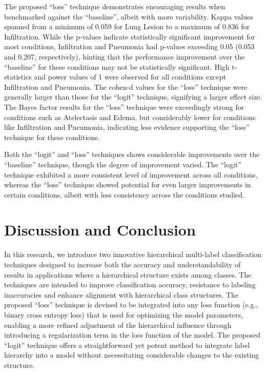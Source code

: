 \documentclass[review,1p,times,numbers]{elsarticle}
\begin{document}
The proposed ``loss'' technique demonstrates encouraging results when benchmarked against the ``baseline'', albeit with more variability. Kappa values spanned from a minimum of 0.059 for Lung Lesion to a maximum of 0.836 for Infiltration. While the p-values indicate statistically significant improvement for most conditions, Infiltration and Pneumonia had p-values exceeding 0.05 (0.053 and 0.207, respectively), hinting that the performance improvement over the ``baseline'' for these conditions may not be statistically significant. High t-statistics and power values of 1 were observed for all conditions except Infiltration and Pneumonia. The cohen-d values for the ``loss'' technique were generally larger than those for the ``logit'' technique, signifying a larger effect size. The Bayes factor results for the ``loss'' technique were exceedingly strong for conditions such as Atelectasis and Edema, but considerably lower for conditions like Infiltration and Pneumonia, indicating less evidence supporting the ``loss'' technique for these conditions.

Both the ``logit'' and ``loss'' techniques shows considerable improvements over the ``baseline'' technique, though the degree of improvement varied. The ``logit'' technique exhibited a more consistent level of improvement across all conditions, whereas the ``loss'' technique showed potential for even larger improvements in certain conditions, albeit with less consistency across the conditions studied.

\section{Discussion and Conclusion}\label{sec:taxonomy.discussion}
In this research, we introduce two innovative hierarchical multi-label classification techniques designed to increase both the accuracy and understandability of results in applications where a hierarchical structure exists among classes. The techniques are intended to improve classification accuracy, resistance to labeling inaccuracies and enhance alignment with hierarchical class structures. The proposed ``loss'' technique is devised to be integrated into any loss function (e.g., binary cross entropy loss) that is used for optimizing the model parameters, enabling a more refined adjustment of the hierarchical influence through introducing a regularization term in the loss function of the model. The proposed ``logit'' technique offers a straightforward yet potent method to integrate label hierarchy into a model without necessitating considerable changes to the existing structure.
\end{document}
